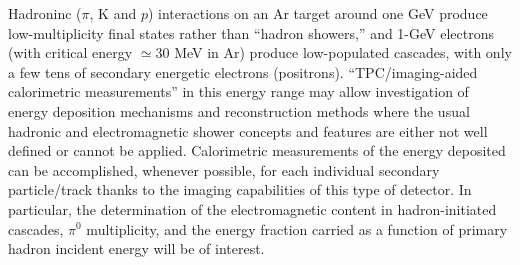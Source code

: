 

 Hadroninc ($\pi$, K and $p$) interactions on an Ar target around one GeV produce low-multiplicity final states rather than ``hadron showers,'' 
 and 1-GeV electrons  (with critical energy $\simeq 30$ MeV in Ar) produce low-populated cascades, with only a few tens of secondary energetic electrons (positrons). 
``TPC/imaging-aided calorimetric measurements'' in this energy range may allow investigation of 
energy deposition mechanisms and reconstruction methods where the usual hadronic and electromagnetic shower concepts and features are either not well defined or cannot be applied.
Calorimetric measurements of the energy deposited can be accomplished,  whenever possible, for each individual secondary particle/track thanks to the imaging capabilities of this type of detector.
In particular, the determination of the electromagnetic  content in hadron-initiated cascades, $\pi^0$ multiplicity, and the energy fraction carried as a function of primary hadron incident energy will be of interest.



